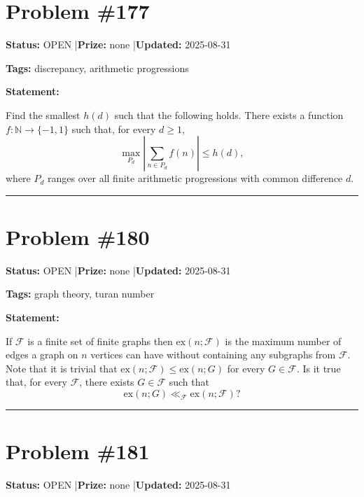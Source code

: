 \documentclass{article}
\begin{document}
\section{Problem \#177}
\label{prob:177}

\noindent\textbf{Status:} OPEN \quad|\quad \textbf{Prize:} none \quad|\quad \textbf{Updated:} 2025-08-31

\noindent\textbf{Tags:} discrepancy, arithmetic progressions

\medskip

\noindent\textbf{Statement:}

Find the smallest $h(d)$ such that the following holds. There exists a function $f:\mathbb{N}\to\{-1,1\}$ such that, for every $d\geq 1$,\[\max_{P_d}\left\lvert \sum_{n\in P_d}f(n)\right\rvert\leq h(d),\]where $P_d$ ranges over all finite arithmetic progressions with common difference $d$.

\noindent\rule{\linewidth}{0.4pt}


\section{Problem \#180}
\label{prob:180}

\noindent\textbf{Status:} OPEN \quad|\quad \textbf{Prize:} none \quad|\quad \textbf{Updated:} 2025-08-31

\noindent\textbf{Tags:} graph theory, turan number

\medskip

\noindent\textbf{Statement:}

If $\mathcal{F}$ is a finite set of finite graphs then $\mathrm{ex}(n;\mathcal{F})$ is the maximum number of edges a graph on $n$ vertices can have without containing any subgraphs from $\mathcal{F}$. Note that it is trivial that $\mathrm{ex}(n;\mathcal{F})\leq \mathrm{ex}(n;G)$ for every $G\in\mathcal{F}$. Is it true that, for every $\mathcal{F}$, there exists $G\in\mathcal{F}$ such that\[\mathrm{ex}(n;G)\ll_{\mathcal{F}}\mathrm{ex}(n;\mathcal{F})?\]

\noindent\rule{\linewidth}{0.4pt}


\section{Problem \#181}
\label{prob:181}

\noindent\textbf{Status:} OPEN \quad|\quad \textbf{Prize:} none \quad|\quad \textbf{Updated:} 2025-08-31
\end{document}
